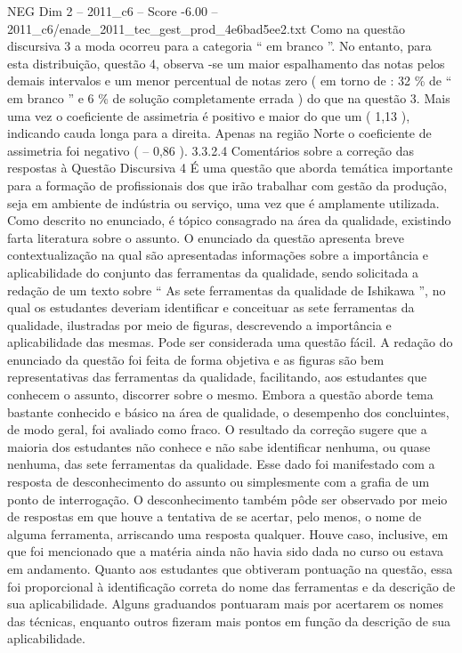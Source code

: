 \begin{textsample}{NEG Dim 2 – 2011\_c6 – Score -6.00 – 2011\_c6/enade\_2011\_tec\_gest\_prod\_4e6bad5ee2.txt}
Como na questão discursiva 3 a moda ocorreu para a categoria “ em branco ”.
No entanto, para esta distribuição, questão 4, observa -se um maior espalhamento das notas pelos demais intervalos e um menor percentual de notas zero ( em torno de : 32 \% de “ em branco ” e 6 \% de solução completamente errada ) do que na questão 3.
Mais uma vez o coeficiente de assimetria é positivo e maior do que um ( 1,13 ), indicando cauda longa para a direita.
Apenas na região Norte o coeficiente de assimetria foi negativo ( – 0,86 ). 3.3.2.4 Comentários sobre a correção das respostas à Questão Discursiva 4 É uma questão que aborda temática importante para a formação de profissionais dos que irão trabalhar com gestão da produção, seja em ambiente de indústria ou serviço, uma vez que é amplamente utilizada.
Como descrito no enunciado, é tópico consagrado na área da qualidade, existindo farta literatura sobre o assunto.
O enunciado da questão apresenta breve contextualização na qual são apresentadas informações sobre a importância e aplicabilidade do conjunto das ferramentas da qualidade, sendo solicitada a redação de um texto sobre “ As sete ferramentas da qualidade de Ishikawa ”, no qual os estudantes deveriam identificar e conceituar as sete ferramentas da qualidade, ilustradas por meio de figuras, descrevendo a importância e aplicabilidade das mesmas.
Pode ser considerada uma questão fácil.
A redação do enunciado da questão foi feita de forma objetiva e as figuras são bem representativas das ferramentas da qualidade, facilitando, aos estudantes que conhecem o assunto, discorrer sobre o mesmo.
Embora a questão aborde tema bastante conhecido e básico na área de qualidade, o desempenho dos concluintes, de modo geral, foi avaliado como fraco.
O resultado da correção sugere que a maioria dos estudantes não conhece e não sabe identificar nenhuma, ou quase nenhuma, das sete ferramentas da qualidade.
Esse dado foi manifestado com a resposta de desconhecimento do assunto ou simplesmente com a grafia de um ponto de interrogação.
O desconhecimento também pôde ser observado por meio de respostas em que houve a tentativa de se acertar, pelo menos, o nome de alguma ferramenta, arriscando uma resposta qualquer.
Houve caso, inclusive, em que foi mencionado que a matéria ainda não havia sido dada no curso ou estava em andamento.
Quanto aos estudantes que obtiveram pontuação na questão, essa foi proporcional à identificação correta do nome das ferramentas e da descrição de sua aplicabilidade.
Alguns graduandos pontuaram mais por acertarem os nomes das técnicas, enquanto outros fizeram mais pontos em função da descrição de sua aplicabilidade.

\end{textsample}
